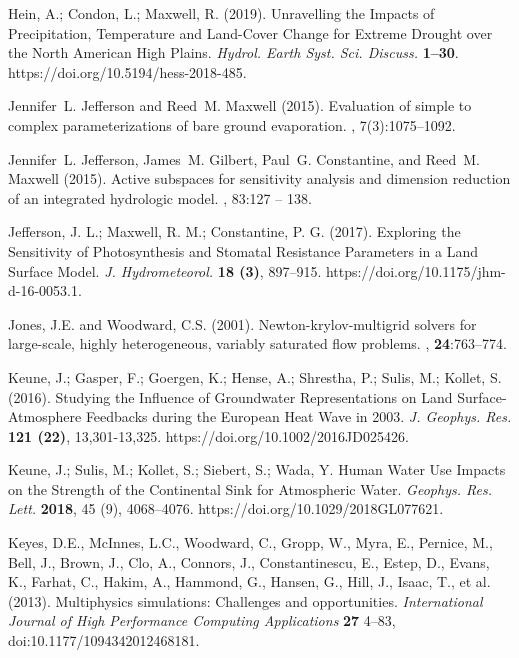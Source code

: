 \begin{thebibliography}{999}
Hein, A.; Condon, L.; Maxwell, R. (2019). Unravelling the Impacts of Precipitation, Temperature and Land-Cover Change for Extreme Drought over the North American High Plains. {\em Hydrol. Earth Syst. Sci. Discuss.} {\bf 1–30}. https://doi.org/10.5194/hess-2018-485.

	Jennifer~L. Jefferson and Reed~M. Maxwell (2015).
\newblock Evaluation of simple to complex parameterizations of bare ground
  evaporation.
, 7(3):1075--1092.

Jennifer~L. Jefferson, James~M. Gilbert, Paul~G. Constantine, and Reed~M.
Maxwell (2015).
\newblock Active subspaces for sensitivity analysis and dimension reduction of
  an integrated hydrologic model.
, 83:127 -- 138.

Jefferson, J. L.; Maxwell, R. M.; Constantine, P. G. (2017). Exploring the Sensitivity of Photosynthesis and Stomatal Resistance Parameters in a Land Surface Model. {\em J. Hydrometeorol.} {\bf 18 (3)}, 897–915. https://doi.org/10.1175/jhm-d-16-0053.1.


Jones, J.E. and Woodward, C.S. (2001).
\newblock Newton-krylov-multigrid solvers for large-scale, highly heterogeneous, variably saturated flow problems.
, {\bf 24}:763--774.


Keune, J.; Gasper, F.; Goergen, K.; Hense, A.; Shrestha, P.; Sulis, M.; Kollet, S. (2016). Studying the Influence of Groundwater Representations on Land Surface-Atmosphere Feedbacks during the European Heat Wave in 2003. {\em J. Geophys. Res.} {\bf 121 (22)}, 13,301-13,325. https://doi.org/10.1002/2016JD025426.


Keune, J.; Sulis, M.; Kollet, S.; Siebert, S.; Wada, Y. Human Water Use Impacts on the Strength of the Continental Sink for Atmospheric Water. {\em Geophys. Res. Lett.} {\bf 2018}, 45 (9), 4068–4076. https://doi.org/10.1029/2018GL077621.

Keyes, D.E., McInnes, L.C., Woodward, C., Gropp, W., Myra, E., Pernice, M., Bell, J., Brown, J., Clo, A., Connors, J., Constantinescu, E., Estep, D., Evans, K., Farhat, C., Hakim, A., Hammond, G., Hansen, G., Hill, J., Isaac, T., et al. (2013). Multiphysics simulations: Challenges and opportunities. {\em International Journal of High Performance Computing Applications} {\bf 27} 4--83, doi:10.1177/1094342012468181.



\end{thebibliography}
